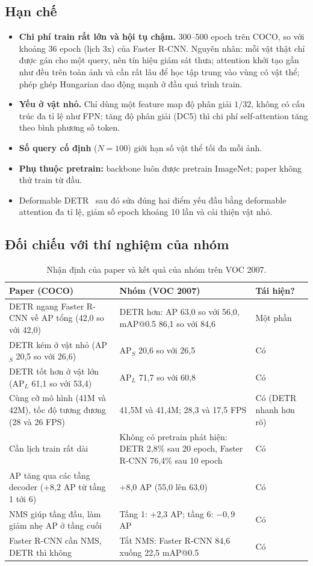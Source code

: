 \documentclass[11pt, a4paper]{article}
\begin{document}
\subsection{Hạn chế}
\begin{itemize}
  \item \textbf{Chi phí train rất lớn và hội tụ chậm.} 300--500 epoch trên COCO, so với khoảng 36 epoch (lịch 3x) của Faster R-CNN. Nguyên nhân: mỗi vật thật chỉ được gán cho một query, nên tín hiệu giám sát thưa; attention khởi tạo gần như đều trên toàn ảnh và cần rất lâu để học tập trung vào vùng có vật thể; phép ghép Hungarian dao động mạnh ở đầu quá trình train.
  \item \textbf{Yếu ở vật nhỏ.} Chỉ dùng một feature map độ phân giải $1/32$, không có cấu trúc đa tỉ lệ như FPN; tăng độ phân giải (DC5) thì chi phí self-attention tăng theo bình phương số token.
  \item \textbf{Số query cố định} ($N = 100$) giới hạn số vật thể tối đa mỗi ảnh.
  \item \textbf{Phụ thuộc pretrain:} backbone luôn được pretrain ImageNet; paper không thử train từ đầu.
  \item Deformable DETR~\cite{zhu2021deformable} sau đó sửa đúng hai điểm yếu đầu bằng deformable attention đa tỉ lệ, giảm số epoch khoảng 10 lần và cải thiện vật nhỏ.
\end{itemize}

\subsection{Đối chiếu với thí nghiệm của nhóm}
\begin{table}[H]
  \centering
  \caption{Nhận định của paper và kết quả của nhóm trên VOC 2007.}
  \label{tab:compare}
  \small
  \begin{tabularx}{\linewidth}{YYl}
    \toprule
    \textbf{Paper (COCO)} & \textbf{Nhóm (VOC 2007)} & \textbf{Tái hiện?} \\
    \midrule
    DETR ngang Faster R-CNN về AP tổng (42,0 so với 42,0) & DETR hơn: AP 63,0 so với 56,0, mAP@0.5 86,1 so với 84,6 & Một phần \\
    DETR kém ở vật nhỏ (AP$_S$ 20,5 so với 26,6) & AP$_S$ 20,6 so với 26,5 & Có \\
    DETR tốt hơn ở vật lớn (AP$_L$ 61,1 so với 53,4) & AP$_L$ 71,7 so với 60,8 & Có \\
    Cùng cỡ mô hình (41M và 42M), tốc độ tương đương (28 và 26 FPS) & 41,5M và 41,4M; 28,3 và 17,5 FPS & Có (DETR nhanh hơn rõ) \\
    Cần lịch train rất dài & Không có pretrain phát hiện: DETR 2,8\% sau 20 epoch, Faster R-CNN 76,4\% sau 10 epoch & Có \\
    AP tăng qua các tầng decoder (+8,2 AP từ tầng 1 tới 6) & +8,0 AP (55,0 lên 63,0) & Có \\
    NMS giúp tầng đầu, làm giảm nhẹ AP ở tầng cuối & Tầng 1: +2,3 AP; tầng 6: $-0{,}9$ AP & Có \\
    Faster R-CNN cần NMS, DETR thì không & Tắt NMS: Faster R-CNN 84,6 xuống 22,5 mAP@0.5 & Có \\
    \bottomrule
  \end{tabularx}
\end{table}
\end{document}
